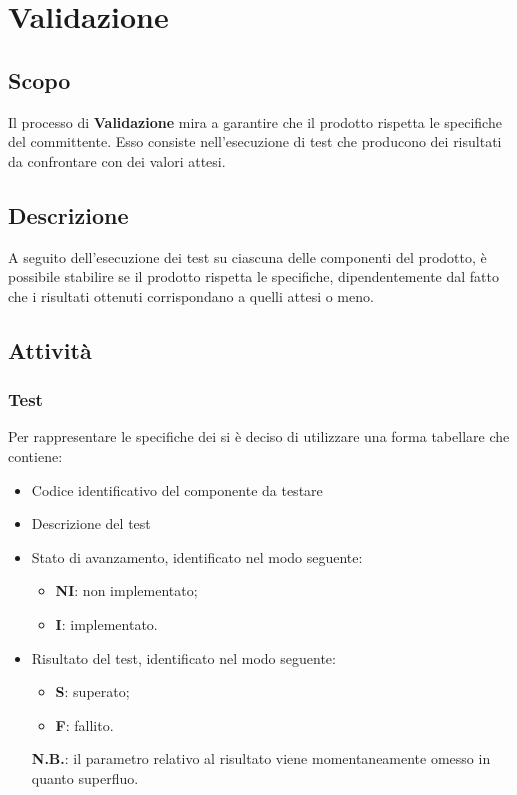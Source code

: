 		\section{Validazione}
		\subsection{Scopo}
		Il processo di \textbf{Validazione} mira a garantire che il prodotto rispetta le specifiche del committente. Esso consiste nell'esecuzione di test che producono dei risultati da confrontare con dei valori attesi.
		
		\subsection{Descrizione}
		A seguito dell'esecuzione dei test su ciascuna delle componenti del prodotto, è possibile stabilire se il prodotto rispetta le specifiche, dipendentemente dal fatto che i risultati ottenuti corrispondano a quelli attesi o meno. 
	
		\subsection{Attività}
		\subsubsection{Test}
		Per rappresentare le specifiche dei  si è deciso di utilizzare una forma tabellare che contiene:
				\begin{itemize}
					\item Codice identificativo del componente da testare
					\item Descrizione del test
					\item Stato di avanzamento, identificato nel modo seguente:
						\begin{itemize}
							\item \textbf{NI}: non implementato;
							\item \textbf{I}: implementato.						
						\end{itemize}		
					\item Risultato del test, identificato nel modo seguente:
						\begin{itemize}
							\item \textbf{S}: superato;
							\item \textbf{F}: fallito.
						\end{itemize}
						\textbf{N.B.}: il parametro relativo al risultato viene momentaneamente omesso in quanto superfluo.						 
				\end{itemize}		
		
